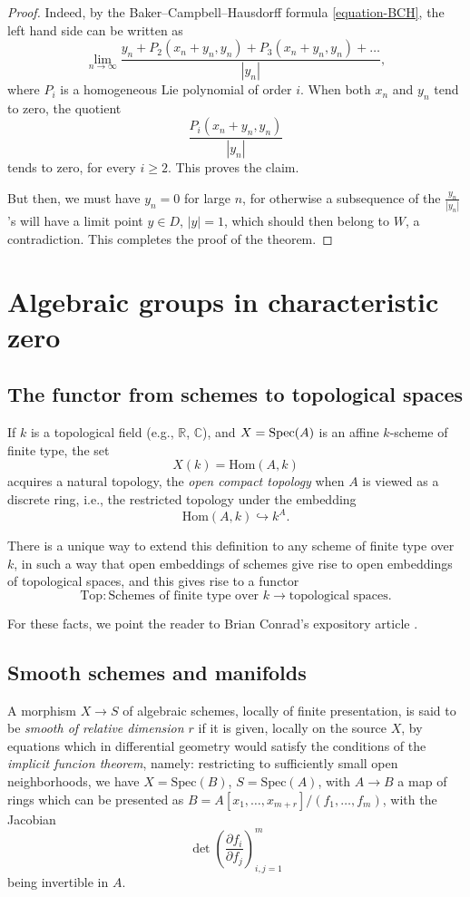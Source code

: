 \begin{proof}
Indeed, by the Baker--Campbell--Hausdorff formula \eqref{equation-BCH}, the left hand side can be written as
$$\lim_{n\to \infty} \frac{y_n + P_2(x_n+y_n,y_n) + P_3 (x_n+y_n,y_n) + \dots}{|y_n|},$$
where $P_i$ is a homogeneous Lie polynomial of order $i$. When both $x_n$ and $y_n$ tend to zero, the quotient 
$$ \frac{P_i(x_n+y_n,y_n)}{|y_n|}$$
tends to zero, for every $i\ge 2$. This proves the claim.

But then, we must have $y_n=0$ for large $n$, for otherwise a subsequence of the $\frac{y_n}{|y_n|}$'s will have a limit point $y\in D$, $|y|=1$, which should then belong to $W$, a contradiction. This completes the proof of the theorem.

\end{proof}

\section{Algebraic groups in characteristic zero}
\label{section-algebraic-groups}

\subsection{The functor from schemes to topological spaces}
\label{subsection-schemes-to-top}

If $k$ is a topological field (e.g., $\mathbb R$, $\mathbb C$), and $X = \mathop{\rm Spec}(A)$ is an affine $k$-scheme of finite type, the set 
$$ X(k) = \text{Hom}(A,k)$$
acquires a natural topology, the \emph{open compact topology} when $A$ is viewed as a discrete ring, i.e., the restricted topology under the embedding
$$ \text{Hom}(A,k) \hookrightarrow k^A.$$

There is a unique way to extend this definition to any scheme of finite type over $k$, in such a way that open embeddings of schemes give rise to open embeddings of topological spaces, and this gives rise to a functor 
$$ \text{Top}: \text{Schemes of finite type over }k \to \text{topological spaces}.$$

For these facts, we point the reader to Brian Conrad's expository article \cite{Conrad-Weil}.

\subsection{Smooth schemes and manifolds}
\label{subsection-smoothschemes-to-manifolds}

A morphism $X\to S$ of algebraic schemes, locally of finite presentation, is said to be \emph{smooth of relative dimension $r$} if it is given, locally on the source $X$, by equations which in differential geometry would satisfy the conditions of the \emph{implicit funcion theorem}, namely: restricting to sufficiently small open neighborhoods, we have $X=\text{Spec}(B)$, $S=\text{Spec}(A)$, with $A\to B$ a map of rings which can be presented as $B=A[x_1, \dots, x_{m+r}]/(f_1, \dots, f_m)$, with the Jacobian
$$ \det \left( \frac{\partial f_i}{\partial f_j} \right)_{i, j=1}^m $$
being invertible in $A$. 

